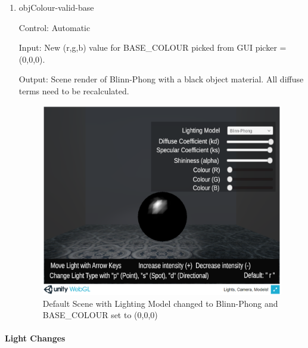 \documentclass[12pt, titlepage]{article}
\begin{document}
\begin{enumerate}
	
	
	\item{objColour-valid-base\\}
	
	Control: Automatic
	
	Input: New (r,g,b) value for BASE\_COLOUR picked from GUI picker = 
	(0,0,0).
	
	Output: Scene render of Blinn-Phong with a black object material. All 
	diffuse terms need to be recalculated.
	
	\begin{figure}[h]
		\centering
		\includegraphics[scale=0.25]{./images/fromVnVPlan/sphere-lit-blinnphong-colour}
		\caption{Default Scene with Lighting Model changed to Blinn-Phong and 
			BASE\_COLOUR set to (0,0,0)}
		\label{fig:blinnPhong-black}
	\end{figure}	
	


\end{enumerate}

\paragraph{Light Changes}
\end{document}

